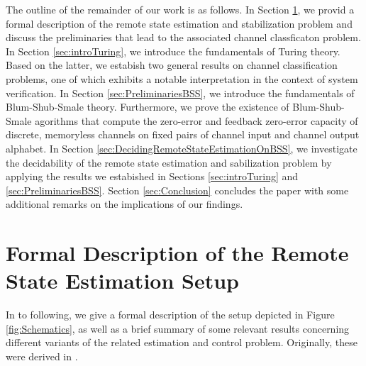 \documentclass[conference]{IEEEtran}
\begin{document}
	The outline of the remainder of our work is as follows. In Section \ref{sec:FormalEstimationSetup}, we provid a formal description of the remote state estimation and stabilization problem
	and discuss the preliminaries that lead to the associated channel classficaton problem. In Section \ref{sec:introTuring}, we introduce the fundamentals of Turing theory.
	Based on the latter, we estabish two general results on channel classification problems, one of which exhibits a notable interpretation in the context of system verification. 
	In Section \ref{sec:PreliminariesBSS}, we introduce the fundamentals of Blum-Shub-Smale theory. Furthermore, we prove the existence of 
	Blum-Shub-Smale agorithms that compute the zero-error and feedback zero-error capacity of discrete, memoryless channels on fixed pairs of channel input and channel output alphabet. 
	In Section \ref{sec:DecidingRemoteStateEstimationOnBSS}, we investigate the decidability of the remote state estimation and sabilization problem 
	by applying the results we estabished in Sections \ref{sec:introTuring} and \ref{sec:PreliminariesBSS}. Section \ref{sec:Conclusion} concludes the paper with some additional 
	remarks on the implications of our findings. 
                                                                        
\color{gray}\section{Formal Description of the Remote State Estimation Setup}	\label{sec:FormalEstimationSetup}
	\noindent In to following, we give a formal description of the setup depicted in Figure \ref{fig:Schematics}, as well as a brief summary of 
	some relevant results concerning different variants of the related estimation and control problem. Originally, these were derived in \cite{MS07, MS07SC}.  
	
\end{document}
